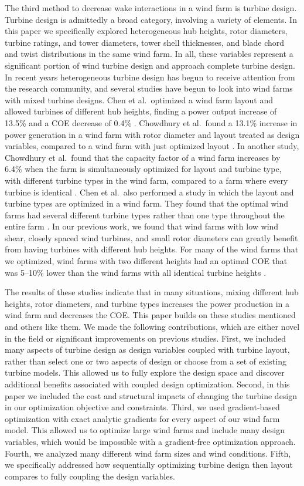The third method to decrease wake interactions in a wind farm is turbine design. Turbine design is admittedly a broad category, involving a variety of elements. In this paper we specifically explored heterogeneous hub heights, rotor diameters, turbine ratings, and tower diameters, tower shell thicknesses, and blade chord and twist distributions in the same wind farm. In all, these variables represent a significant portion of wind turbine design and approach complete turbine design. 
In recent years heterogeneous turbine design has begun to receive attention from the research community, and several studies have begun to look into wind farms with mixed turbine designs. Chen et al.~optimized
a wind farm layout and allowed turbines of different hub heights, finding a power output increase of 13.5\% and a COE decrease of 0.4\% \citep{chen2013wind}. Chowdhury et al.~found
a 13.1\% increase in power generation in a wind farm with rotor diameter and layout treated as design variables, compared to a wind farm with just optimized layout \citep{chowdhury2010optimizing}. In another study, Chowdhury et al.~found that the capacity factor of a wind farm increases by 6.4\% when the farm is simultaneously optimized for layout and turbine type, with different turbine types in the wind farm, compared to a farm where every turbine is identical \citep{chowdhury2013optimizing}. Chen et al.~also performed a study in which the layout and turbine types are optimized in a wind farm. They found that the optimal wind farms had several different turbine types rather than one type throughout the entire farm \citep{chen2015multi}. In our previous work, we found that wind farms with low wind shear, closely spaced wind turbines, and small rotor diameters can greatly benefit from having turbines with different hub heights. For many of the wind farms that we optimized, wind farms with two different heights had an optimal COE that was 5--10\% lower than the wind farms with all identical turbine heights \citep{stanley2018}.

The results of these studies indicate that in many situations, mixing different hub heights, rotor diameters, and turbine types increases the power production in a wind farm and decreases the COE. This paper builds on these studies mentioned and others like them.
We made the following contributions, which are either novel in the field or significant improvements on previous studies.
First, we included many aspects of turbine design as design variables coupled with turbine layout, rather than select one or two aspects of design or choose from a set of existing turbine models. This allowed us to fully explore the design space and discover additional benefits associated with coupled design optimization.
Second, in this paper we included the cost and structural impacts of changing the turbine design in our optimization objective and constraints.
Third, we used gradient-based optimization with exact analytic gradients for every aspect of our wind farm model. This allowed us to optimize large wind farms and include many design variables, which would be impossible with a gradient-free optimization approach.
Fourth, we analyzed many different wind farm sizes and wind conditions.
Fifth, we specifically addressed how sequentially optimizing turbine design then layout compares to fully coupling the design variables.
